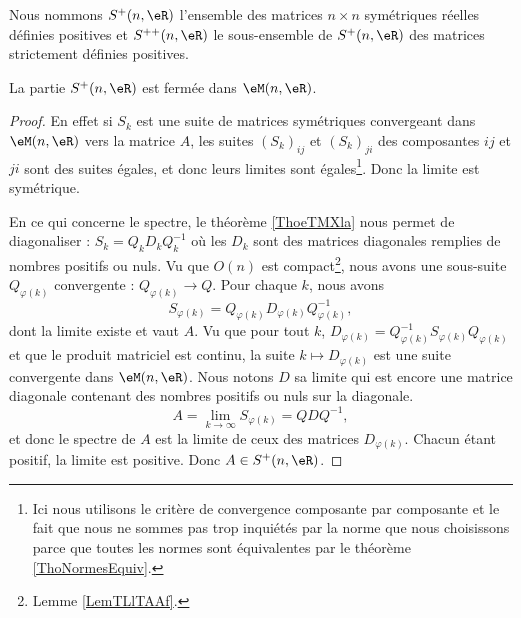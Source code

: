 Nous nommons \( S^+(n,\eR)\) l'ensemble des matrices \( n\times n\) symétriques réelles définies positives et \( S^{++}(n,\eR)\) le sous-ensemble de \( S^+(n,\eR)\) des matrices strictement définies positives.

\begin{lemma}   \label{LemMGUSooPqjguE}
    La partie \( S^+(n,\eR)\) est fermée dans \( \eM(n,\eR)\).
\end{lemma}

\begin{proof}
    En effet si \( S_k\) est une suite de matrices symétriques convergeant dans \( \eM(n,\eR)\) vers la matrice \( A\), les suites \( (S_k)_{ij}\) et \( (S_k)_{ji}\) des composantes \( ij\) et \( ji\) sont des suites égales, et donc leurs limites sont égales\footnote{Ici nous utilisons le critère de convergence composante par composante et le fait que nous ne sommes pas trop inquiétés par la norme que nous choisissons parce que toutes les normes sont équivalentes par le théorème \ref{ThoNormesEquiv}.}. Donc la limite est symétrique.

    En ce qui concerne le spectre, le théorème \ref{ThoeTMXla} nous permet de diagonaliser : \( S_k=Q_kD_kQ_k^{-1}\) où les \( D_k\) sont des matrices diagonales remplies de nombres positifs ou nuls. Vu que \( O(n)\) est compact\footnote{Lemme \ref{LemTLlTAAf}.}, nous avons une sous-suite \( Q_{\varphi(k)}\) convergente : \( Q_{\varphi(k)}\to Q\). Pour chaque \( k\), nous avons
    \begin{equation}
        S_{\varphi(k)}=Q_{\varphi(k)}D_{\varphi(k)}Q^{-1}_{\varphi(k)},
    \end{equation}
    dont la limite existe et vaut \( A\). Vu que pour tout \( k\), \( D_{\varphi(k)}=Q^{-1}_{\varphi(k)}S_{\varphi(k)}Q_{\varphi(k)}\) et que le produit matriciel est continu, la suite \( k\mapsto D_{\varphi(k)}\) est une suite convergente dans \( \eM(n,\eR)\). Nous notons \( D\) sa limite qui est encore une matrice diagonale contenant des nombres positifs ou nuls sur la diagonale.
    \begin{equation}
        A=\lim_{k\to \infty } S_{\varphi(k)}=QDQ^{-1},
    \end{equation}
    et donc le spectre de \( A\) est la limite de ceux des matrices \( D_{\varphi(k)}\). Chacun étant positif, la limite est positive. Donc \( A\in S^+(n,\eR)\).
\end{proof}

